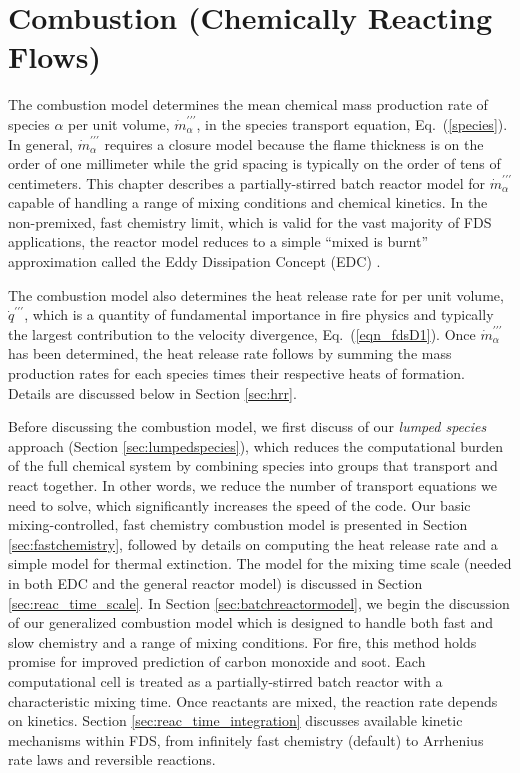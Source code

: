 

\chapter{Combustion (Chemically Reacting Flows)}
\label{chapter:combustion}

\label{combustionsection}
The combustion model determines the mean chemical mass production rate of species $\alpha$ per unit volume, $\dot{m}^{\prime\prime\prime}_{\alpha}$, in the species transport equation, Eq.~(\ref{species}).  In general, $\dot{m}^{\prime\prime\prime}_{\alpha}$ requires a closure model because the flame thickness is on the order of one millimeter while the grid spacing is typically on the order of tens of centimeters.  This chapter describes a partially-stirred batch reactor model for $\dot{m}^{\prime\prime\prime}_{\alpha}$ capable of handling a range of mixing conditions and chemical kinetics.  In the non-premixed, fast chemistry limit, which is valid for the vast majority of FDS applications, the reactor model reduces to a simple ``mixed is burnt'' approximation called the Eddy Dissipation Concept (EDC) \cite{Magnussen:1,Poinsot:TNC}.

The combustion model also determines the heat release rate for per unit volume, $\dot{q}^{\prime\prime\prime}$, which is a quantity of fundamental importance in fire physics and typically the largest contribution to the velocity divergence, Eq.~(\ref{eqn_fdsD1}).  Once $\dot{m}^{\prime\prime\prime}_{\alpha}$ has been determined, the heat release rate follows by summing the mass production rates for each species times their respective heats of formation.  Details are discussed below in Section \ref{sec:hrr}.

Before discussing the combustion model, we first discuss of our \emph{lumped species} approach (Section \ref{sec:lumpedspecies}), which reduces the computational burden of the full chemical system by combining species into groups that transport and react together.  In other words, we reduce the number of transport equations we need to solve, which significantly increases the speed of the code.  Our basic mixing-controlled, fast chemistry combustion model is presented in Section \ref{sec:fastchemistry}, followed by details on computing the heat release rate and a simple model for thermal extinction. The model for the mixing time scale (needed in both EDC and the general reactor model) is discussed in Section \ref{sec:reac_time_scale}. In Section \ref{sec:batchreactormodel}, we begin the discussion of our generalized combustion model which is designed to handle both fast and slow chemistry and a range of mixing conditions.  For fire, this method holds promise for improved prediction of carbon monoxide and soot. Each computational cell is treated as a partially-stirred batch reactor with a characteristic mixing time.  Once reactants are mixed, the reaction rate depends on kinetics.  Section \ref{sec:reac_time_integration} discusses available kinetic mechanisms within FDS, from infinitely fast chemistry (default) to Arrhenius rate laws and reversible reactions.

